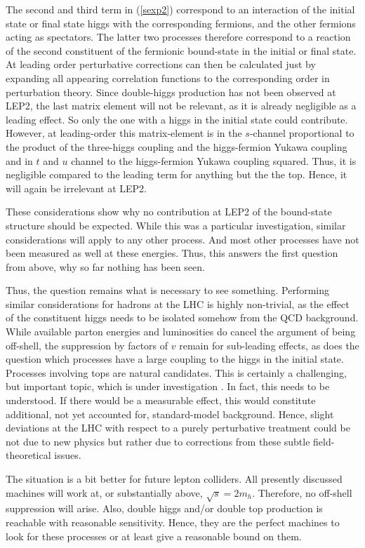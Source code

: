 \documentclass[final,twoside,12pt]{article}
\newcommand*{\pref}[1]{(\ref{#1})}
\newcommand*{\1}{1\!\!\!\bot}
\begin{document}
The second and third term in \pref{sexp2} correspond to an interaction of the initial state or final state higgs with the corresponding fermions, and the other fermions acting as spectators. The latter two processes therefore correspond to a reaction of the second constituent of the fermionic bound-state in the initial or final state. At leading order perturbative corrections can then be calculated just by expanding all appearing correlation functions to the corresponding order in perturbation theory. Since double-higgs production has not been observed at LEP2, the last matrix element will not be relevant, as it is already negligible as a leading effect. So only the one with a higgs in the initial state could contribute. However, at leading-order this matrix-element is in the $s$-channel proportional to the product of the three-higgs coupling and the higgs-fermion Yukawa coupling and in $t$ and $u$ channel to the higgs-fermion Yukawa coupling squared. Thus, it is negligible compared to the leading term for anything but the the top. Hence, it will again be irrelevant at LEP2.

These considerations show why no contribution at LEP2 of the bound-state structure should be expected. While this was a particular investigation, similar considerations will apply to any other process. And most other processes have not been measured as well at these energies. Thus, this answers the first question from above, why so far nothing has been seen.

Thus, the question remains what is necessary to see something. Performing similar considerations for hadrons at the LHC is highly non-trivial, as the effect of the constituent higgs needs to be isolated somehow from the QCD background. While available parton energies and luminosities do cancel the argument of being off-shell, the suppression by factors of $v$ remain for sub-leading effects, as does the question which processes have a large coupling to the higgs in the initial state. Processes involving tops are natural candidates. This is certainly a challenging, but important topic, which is under investigation \cite{Fernbach:unpublished}. In fact, this needs to be understood. If there would be a measurable effect, this would constitute additional, not yet accounted for, standard-model background. Hence, slight deviations at the LHC with respect to a purely perturbative treatment could be not due to new physics but rather due to corrections from these subtle field-theoretical issues.

The situation is a bit better for future lepton colliders. All presently discussed machines will work at, or substantially above, $\sqrt{s}=2m_h$. Therefore, no off-shell suppression will arise. Also, double higgs and/or double top production is reachable with reasonable sensitivity. Hence, they are the perfect machines to look for these processes or at least give a reasonable bound on them.
\end{document}
